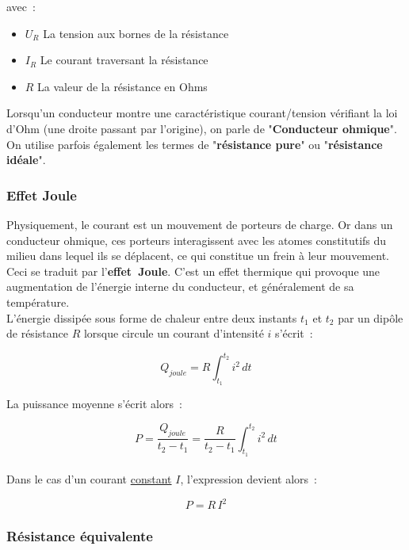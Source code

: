 avec~:\\

\begin{itemize}
\item $U_R$ La tension aux bornes de la résistance
\item $I_R$ Le courant traversant la résistance
\item $R$ La valeur de la résistance en Ohms\\
\end{itemize}


Lorsqu'un conducteur montre une caractéristique courant/tension vérifiant la loi d'Ohm (une droite passant par l'origine), on parle de "\textbf{Conducteur ohmique}". On utilise parfois également les termes de "\textbf{résistance pure}" ou "\textbf{résistance idéale}".

\subsubsection*{Effet Joule}

Physiquement, le courant est un mouvement de porteurs de charge. Or dans un conducteur ohmique, ces porteurs interagissent avec les atomes constitutifs du milieu dans lequel ils se déplacent, ce qui constitue un frein à leur mouvement. Ceci se traduit par l'\textbf{effet~Joule}. C'est un effet thermique qui provoque une augmentation de l'énergie interne du conducteur, et généralement de sa température. \\

L'énergie dissipée sous forme de chaleur entre deux instants $t_1$ et $t_2$ par un dipôle de résistance $R$ lorsque circule un courant d'intensité $i$ s'écrit~:

$$ Q_{joule} = R \int_{t_1}^{t_2} i^2\,dt $$

La puissance moyenne s'écrit alors~:

$$ P = \dfrac{Q_{joule}}{t_2 - t_1} = \dfrac{R}{t_2 - t_1} \int_{t_1}^{t_2}i^2\,dt $$\\

Dans le cas d'un courant \underline{constant} $I$, l'expression devient alors~:

\begin{equation}
	P = R\,I^2
\end{equation}

\subsubsection*{Résistance équivalente}

